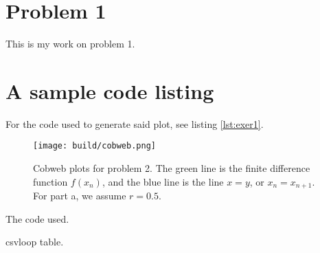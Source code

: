 \documentclass{article}
\begin{document}
\maketitle

\begin{multicols}{2}
\section*{Problem 1}
This is my work on problem 1.

\section*{A sample code listing}
For the code used to generate said plot, see
listing \ref{lst:exer1}.

\end{multicols}

\begin{figure}
  \centering
  \texttt{[image: build/cobweb.png]}
  \caption{
    Cobweb plots for problem 2.
    The green line is the finite difference function $f(x_n)$, and the blue
    line is the line $x=y$, or $x_n = x_{n+1}$.
    For part a, we assume $r=0.5$.
  }
  \label{fig:cobweb}
\end{figure}

\begin{listing}[ht]
   \begin{framed}
    
    \caption{The code used.}
    \label{lst:exer1}
   \end{framed}
\end{listing}


\begin{table}
  \caption{csvloop table.}
  \label{tab:data-numbers-loop}
\end{table}
\end{document}
